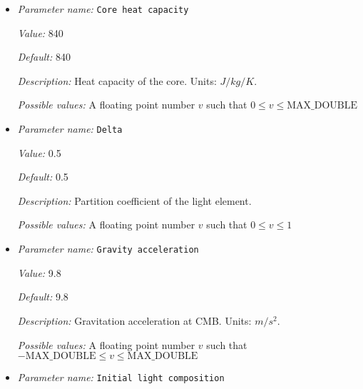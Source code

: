 \begin{itemize}
{\it Value:} 12.5e3


{\it Default:} 12.5e3


{\it Description:} Density of the core. Units: $kg/m^3$.


{\it Possible values:} A floating point number $v$ such that $-\text{MAX\_DOUBLE} \leq v \leq \text{MAX\_DOUBLE}$
\item {\it Parameter name:} {\tt Core heat capacity}
\label{parameters:Boundary temperature model/Dynamic core/Core heat capacity}


{\it Value:} 840


{\it Default:} 840


{\it Description:} Heat capacity of the core. Units: $J/kg/K$.


{\it Possible values:} A floating point number $v$ such that $0 \leq v \leq \text{MAX\_DOUBLE}$
\item {\it Parameter name:} {\tt Delta}
\label{parameters:Boundary temperature model/Dynamic core/Delta}


{\it Value:} 0.5


{\it Default:} 0.5


{\it Description:} Partition coefficient of the light element.


{\it Possible values:} A floating point number $v$ such that $0 \leq v \leq 1$
\item {\it Parameter name:} {\tt Gravity acceleration}
\label{parameters:Boundary temperature model/Dynamic core/Gravity acceleration}


{\it Value:} 9.8


{\it Default:} 9.8


{\it Description:} Gravitation acceleration at CMB. Units: $m/s^2$.


{\it Possible values:} A floating point number $v$ such that $-\text{MAX\_DOUBLE} \leq v \leq \text{MAX\_DOUBLE}$
\item {\it Parameter name:} {\tt Initial light composition}
\label{parameters:Boundary temperature model/Dynamic core/Initial light composition}



\end{itemize}
